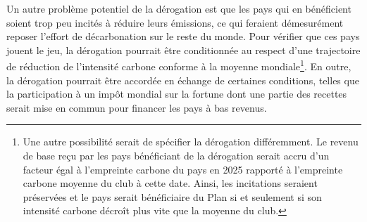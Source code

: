 \documentclass[a5paper,french,openany]{memoir}
\begin{document}
Un autre problème potentiel de la dérogation est que les pays qui en bénéficient soient trop peu incités à réduire leurs émissions, ce qui feraient démesurément reposer l'effort de décarbonation sur le reste du monde. Pour vérifier que ces pays jouent le jeu, la dérogation pourrait être conditionnée au respect d'une trajectoire de réduction de l'intensité carbone conforme à la moyenne mondiale\footnote{Une autre possibilité serait de spécifier la dérogation différemment. Le revenu de base reçu par les pays bénéficiant de la dérogation serait accru d'un facteur égal à l'empreinte carbone du pays en 2025 rapporté à l'empreinte carbone moyenne du club à cette date. Ainsi, les incitations seraient préservées et le pays serait bénéficiaire du Plan si et seulement si son intensité carbone décroît plus vite que la moyenne du club.}. 
En outre, la dérogation pourrait être accordée en échange de certaines conditions, telles que la participation à un impôt mondial sur la fortune dont une partie des recettes serait mise en commun pour financer les pays à bas revenus.
\end{document}
